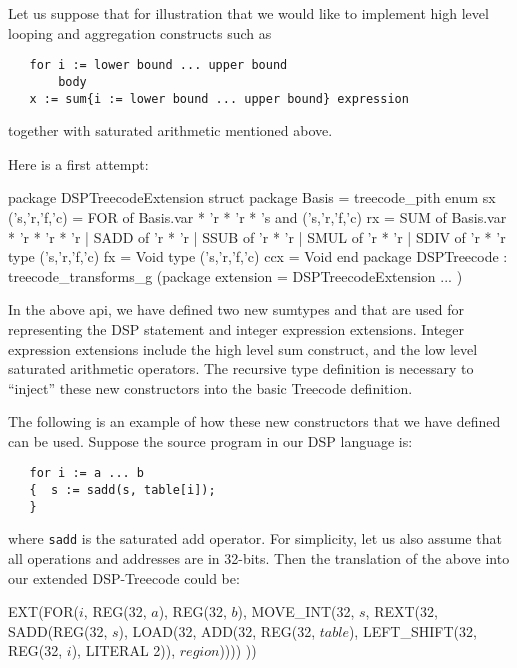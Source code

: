 Let us suppose that for illustration that we would like to
implement high level looping and aggregation constructs such as
\begin{verbatim}
   for i := lower bound ... upper bound
       body
   x := sum{i := lower bound ... upper bound} expression
\end{verbatim}
together with saturated arithmetic mentioned above.

Here is a first attempt:
\begin{SML}
package DSPTreecodeExtension
struct
   package Basis = treecode_pith
   enum sx ('s,'r,'f,'c) = 
      FOR of Basis.var * 'r * 'r * 's
   and ('s,'r,'f,'c) rx = 
      SUM of Basis.var * 'r * 'r * 'r
    | SADD of 'r * 'r
    | SSUB of 'r * 'r
    | SMUL of 'r * 'r
    | SDIV of 'r * 'r
   type ('s,'r,'f,'c) fx = Void
   type ('s,'r,'f,'c) ccx = Void
end
package DSPTreecode : treecode_transforms_g
    (package extension = DSPTreecodeExtension
     ...
    )
\end{SML}
In the above api, we have defined two new sumtypes 
and  that are used for representing the DSP statement
and integer expression extensions.  Integer expression extensions
include the high level sum construct, and the low level saturated
arithmetic operators.  The recursive type definition is
necessary to ``inject'' these new constructors into the basic Treecode 
definition.

The following is an example of how these new constructors that we have defined can be used.  Suppose the source program in our DSP language is:
\begin{verbatim}
   for i := a ... b
   {  s := sadd(s, table[i]);
   }
\end{verbatim}
\noindent where \verb|sadd| is the saturated add operator.
For simplicity, let us also assume that all operations and addresses
are in 32-bits.
Then the translation of the above into our extended DSP-Treecode could be:
\begin{SML}
   EXT(FOR(\(i\), REG(32, \(a\)), REG(32, \(b\)),
           MOVE_INT(32, \(s\), REXT(32, SADD(REG(32, \(s\)), 
                LOAD(32, 
                    ADD(32, REG(32, \(table\)), 
                        LEFT_SHIFT(32, REG(32, \(i\)), LITERAL 2)),
                         \(region\)))))
          ))
\end{SML}

